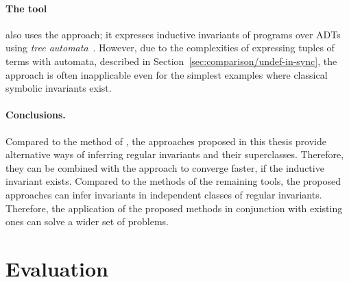 \paragraph{The \rchc{} tool~\cite{haude2020,losekoot_et_al:LIPIcs.FSCD.2023.7}} also uses the \ice{} approach; it expresses inductive invariants of programs over ADTs using \emph{tree automata}~\cite{tata}. However, due to the complexities of expressing tuples of terms with automata, described in Section~\ref{sec:comparison/undef-in-sync}, the approach is often inapplicable even for the simplest examples where classical symbolic invariants exist.

\paragraph{Conclusions.} Compared to the method of \rchc{}, the approaches proposed in this thesis provide alternative ways of inferring regular invariants and their superclasses. Therefore, they can be combined with the \rchc{} approach to converge faster, if the inductive invariant exists. Compared to the methods of the remaining tools, the proposed approaches can infer invariants in independent classes of regular invariants. Therefore, the application of the proposed methods in conjunction with existing ones can solve a wider set of problems.

\section{Evaluation}
